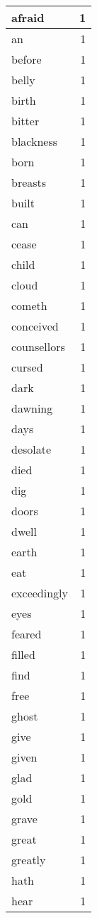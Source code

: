 \begin{center}
\begin{longtable}{l|r}
afraid & 1 \\ \hline
an & 1 \\ \hline
before & 1 \\ \hline
belly & 1 \\ \hline
birth & 1 \\ \hline
bitter & 1 \\ \hline
blackness & 1 \\ \hline
born & 1 \\ \hline
breasts & 1 \\ \hline
built & 1 \\ \hline
can & 1 \\ \hline
cease & 1 \\ \hline
child & 1 \\ \hline
cloud & 1 \\ \hline
cometh & 1 \\ \hline
conceived & 1 \\ \hline
counsellors & 1 \\ \hline
cursed & 1 \\ \hline
dark & 1 \\ \hline
dawning & 1 \\ \hline
days & 1 \\ \hline
desolate & 1 \\ \hline
died & 1 \\ \hline
dig & 1 \\ \hline
doors & 1 \\ \hline
dwell & 1 \\ \hline
earth & 1 \\ \hline
eat & 1 \\ \hline
exceedingly & 1 \\ \hline
eyes & 1 \\ \hline
feared & 1 \\ \hline
filled & 1 \\ \hline
find & 1 \\ \hline
free & 1 \\ \hline
ghost & 1 \\ \hline
give & 1 \\ \hline
given & 1 \\ \hline
glad & 1 \\ \hline
gold & 1 \\ \hline
grave & 1 \\ \hline
great & 1 \\ \hline
greatly & 1 \\ \hline
hath & 1 \\ \hline
hear & 1 \\ \hline

\end{longtable}
\end{center}
